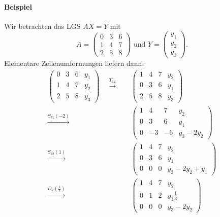  	\paragraph{Beispiel}
 		Wir betrachten das LGS $ AX=Y $ mit
 		\[
 			A =
 			\begin{pmatrix}
 				0 & 3 & 6 \\
 				1 & 4 & 7 \\
 				2 & 5 & 8
 			\end{pmatrix}
 			\text{ und }
 			Y =
 			\begin{pmatrix}
 				y_1 \\ y_2 \\ y_3
 			\end{pmatrix}
 			.
 		\]
 		Elementare Zeilenumformungen liefern dann:
 		\begin{align*}
 			\begin{pmatrix}
 			0 & 3  & 6  & y_1             \\
 			1 & 4  & 7  & y_2             \\
 			2 & 5  & 8  & y_3
 			\end{pmatrix}
 			\quad
 			\overset{T_{12}}{\to}\quad
 			&
 			\begin{pmatrix}
 			1 & 4  & 7  & y_2             \\
 			0 & 3  & 6  & y_1             \\
 			2 & 5  & 8  & y_3
 			\end{pmatrix}
 			\\
 			\overset{S_{31}(-2)}{\to}\quad
 			&
 			\begin{pmatrix}
 			1 & 4  & 7  & y_2             \\
 			0 & 3  & 6  & y_1             \\
 			0 & -3 & -6 & y_3-2y_2
 			\end{pmatrix}
 			\\
 			\overset{S_{32}(1)}{\to}\quad
 			&
 			\begin{pmatrix}
 			1 & 4  & 7  & y_2             \\
 			0 & 3  & 6  & y_1             \\
 			0 & 0  & 0  & y_3-2y_2+y_1
 			\end{pmatrix}
 			\\
 			\overset{D_2(\frac{1}{3})}{\to}\quad
 			&
 			\begin{pmatrix}
 			1 & 4  & 7  & y_2             \\
 			0 & 1  & 2  & y_1 \frac{1}{3} \\
 			0 & 0  & 0  & y_3-2y_2
 			\end{pmatrix}
 		\end{align*}
